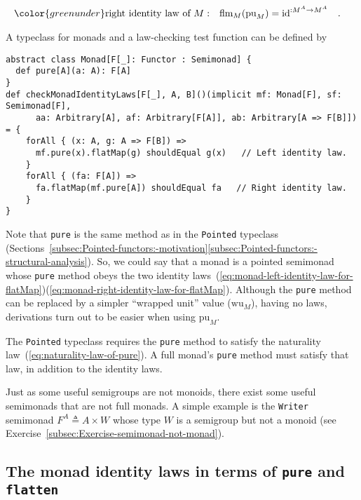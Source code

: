 ~\vspace{-1.4\baselineskip}
\begin{align}
{\color{greenunder}\text{right identity law of }M:}\quad & \text{flm}_{M}(\text{pu}_{M})=\text{id}^{:M^{A}\rightarrow M^{A}}\quad.\label{eq:monad-right-identity-law-for-flatMap}
\end{align}

A typeclass for monads and
a law-checking test function can be defined by
\begin{lstlisting}
abstract class Monad[F[_]: Functor : Semimonad] {
  def pure[A](a: A): F[A]
}
def checkMonadIdentityLaws[F[_], A, B]()(implicit mf: Monad[F], sf: Semimonad[F],
      aa: Arbitrary[A], af: Arbitrary[F[A]], ab: Arbitrary[A => F[B]]) = {
    forAll { (x: A, g: A => F[B]) =>               
      mf.pure(x).flatMap(g) shouldEqual g(x)   // Left identity law.
    }
    forAll { (fa: F[A]) =>               
      fa.flatMap(mf.pure[A]) shouldEqual fa   // Right identity law.
    }
}
\end{lstlisting}

Note that \lstinline!pure! is the same method as in the \lstinline!Pointed!
typeclass (Sections~\ref{subsec:Pointed-functors:-motivation}\textendash \ref{subsec:Pointed-functors:-structural-analysis}).
So, we could say that a monad is a pointed semimonad whose \lstinline!pure!
method obeys the two identity laws~(\ref{eq:monad-left-identity-law-for-flatMap})\textendash (\ref{eq:monad-right-identity-law-for-flatMap}).
Although the \lstinline!pure! method can be replaced by a simpler
\textsf{``}wrapped unit\textsf{''} value ($\text{wu}_{M}$), having no laws, derivations
turn out to be easier when using $\text{pu}_{M}$.

The \lstinline!Pointed! typeclass requires the \lstinline!pure!
method to satisfy the naturality law~(\ref{eq:naturality-law-of-pure}).
A full monad\textsf{'}s \lstinline!pure! method must satisfy that law, in
addition to the identity laws.

Just as some useful semigroups are not monoids, there exist some useful
semimonads that are not full monads. A simple example is the \lstinline!Writer!
semimonad $F^{A}\triangleq A\times W$ whose type $W$ is a semigroup
but not a monoid (see Exercise~\ref{subsec:Exercise-semimonad-not-monad}).

\subsection{The monad identity laws in terms of \texttt{pure} and \texttt{flatten}}

